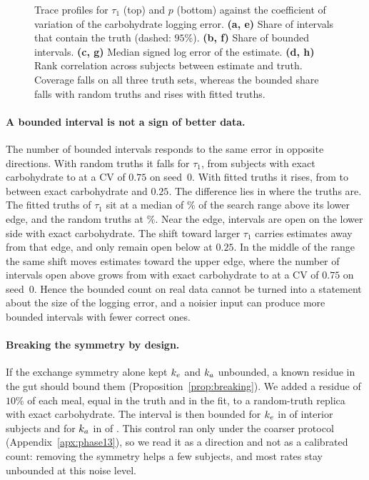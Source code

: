\begin{table}[tbp]
\label{tab:cvsweep}
\end{table}

\begin{figure}[tbp]
\centering
{}
\caption{Trace profiles for $\tau_1$ (top) and $p$ (bottom) against the coefficient of variation of the carbohydrate logging error. \textbf{(a, e)} Share of intervals that contain the truth (dashed: $95\%$). \textbf{(b, f)} Share of bounded intervals. \textbf{(c, g)} Median signed log error of the estimate. \textbf{(d, h)} Rank correlation across subjects between estimate and truth. Coverage falls on all three truth sets, whereas the bounded share falls with random truths and rises with fitted truths.}
\label{fig:cvsweep}
\end{figure}

\paragraph{A bounded interval is not a sign of better data.}
The number of bounded intervals responds to the same error in opposite directions.
With random truths it falls for $\tau_1$, from \resCRandZeroTauBd{} subjects with exact carbohydrate to \resCRandThreeQuarterTauBd{} at a CV of $0.75$ on seed~$0$.
With fitted truths it rises, from \resCFitZeroTauBd{} to \resCFitQuarterTauBd{} between exact carbohydrate and $0.25$.
The difference lies in where the truths are.
The fitted truths of $\tau_1$ sit at a median of \resCFitZeroTauTruthPosPct\% of the search range above its lower edge, and the random truths at \resCRandZeroTauTruthPosPct\%.
Near the edge, \resCFitZeroTauOpenLow{} intervals are open on the lower side with exact carbohydrate.
The shift toward larger $\tau_1$ carries estimates away from that edge, and only \resCFitQuarterTauOpenLow{} remain open below at $0.25$.
In the middle of the range the same shift moves estimates toward the upper edge, where the number of intervals open above grows from \resCRandZeroTauOpenHigh{} with exact carbohydrate to \resCRandThreeQuarterTauOpenHigh{} at a CV of $0.75$ on seed~$0$.
Hence the bounded count on real data cannot be turned into a statement about the size of the logging error, and a noisier input can produce more bounded intervals with fewer correct ones.

\paragraph{Breaking the symmetry by design.}
If the exchange symmetry alone kept $k_e$ and $k_a$ unbounded, a known residue in the gut should bound them (Proposition~\ref{prop:breaking}).
We added a residue of $10\%$ of each meal, equal in the truth and in the fit, to a random-truth replica with exact carbohydrate.
The interval is then bounded for $k_e$ in \resResTenKeBoundedCount{} of \resResTenKeBoundedN{} interior subjects and for $k_a$ in \resResTenKaBoundedCount{} of \resResTenKaBoundedN.
This control ran only under the coarser protocol (Appendix~\ref{apx:phase13}), so we read it as a direction and not as a calibrated count: removing the symmetry helps a few subjects, and most rates stay unbounded at this noise level.
